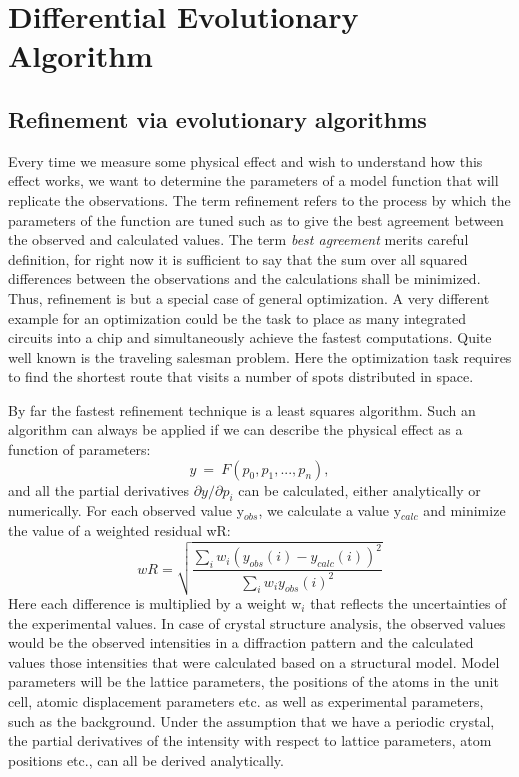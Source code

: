 
\chapter{Differential Evolutionary Algorithm \label{diff}}
\section{Refinement via evolutionary algorithms \label{diff-evol}}

Every time we measure some physical effect and wish to understand
how this effect works, we want to determine the parameters of a 
model function that will replicate the observations. The term 
refinement refers to the process by which the parameters of the
function are tuned such as to give the best agreement between
the observed and calculated values. The term {\it best agreement}
merits careful definition, for right now it is sufficient to say
that the sum over all squared differences between the observations and the 
calculations shall be minimized. Thus, refinement is but a special
case of general optimization. A very different example for an 
optimization could be the task to place as many integrated 
circuits into a chip and simultaneously achieve the fastest computations.
Quite well known is the traveling salesman problem. Here the 
optimization task requires to find the shortest route that 
visits a number of spots distributed in space.  

By far the fastest refinement technique is a least squares algorithm.
Such an algorithm can always be applied if we can describe the 
physical effect as a function of parameters:
\begin{equation}
  y ~=~ F(p_{0}, p_{1}, ..., p_{n}),
\end{equation}
and all the partial derivatives $\partial y/ \partial p_{i}$ can 
be calculated, either analytically or numerically. For each 
observed value y$_{obs}$, we calculate a value y$_{calc}$ and 
minimize the value of a weighted residual wR:
\begin{equation}
   wR = \sqrt{\frac{\sum_{i} w_{i} (y_{obs}(i) - y_{calc}(i))^2}
                   {\sum_{i} w_{i} y_{obs}(i)^2}}
  \label{diff-eq-rval}
\end{equation}
Here each difference is multiplied by a weight w$_{i}$ that reflects
the uncertainties of the experimental values. In case of crystal 
structure analysis, the observed values would be the observed 
intensities in a diffraction pattern and the calculated values 
those intensities that were calculated based on a structural model. 
Model parameters will be the lattice parameters, the positions
of the atoms in the unit cell, atomic displacement parameters etc.
as well as experimental parameters, such as the background.
Under the assumption that we have a periodic crystal, the 
partial derivatives of the intensity with respect to lattice
parameters, atom positions etc., can all be derived analytically.

